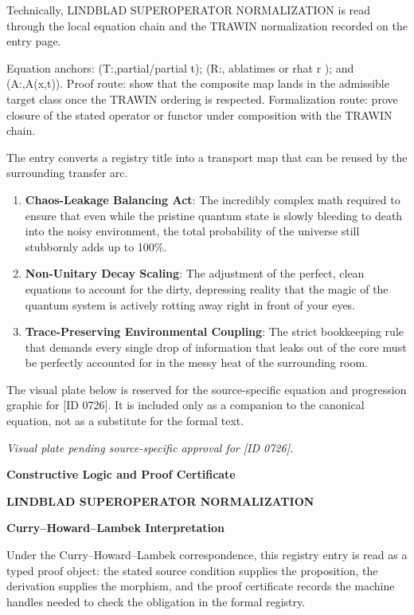 Technically, LINDBLAD SUPEROPERATOR NORMALIZATION is read through the local equation chain and the TRAWIN normalization recorded on the entry page.

Equation anchors: (T:,partial/partial t); (R:, ablatimes or rhat r ); and (A:,A(x,t)). Proof route: show that the composite map lands in the admissible target class once the TRAWIN ordering is respected. Formalization route: prove closure of the stated operator or functor under composition with the TRAWIN chain.

The entry converts a registry title into a transport map that can be reused by the surrounding transfer arc.
\endgroup

\begin{enumerate}[leftmargin=1.6em,itemsep=6pt,topsep=4pt]
\item \textbf{Chaos-Leakage Balancing Act}: The incredibly complex math required to ensure that even while the pristine quantum state is slowly bleeding to death into the noisy environment, the total probability of the universe still stubbornly adds up to 100\%.
\item \textbf{Non-Unitary Decay Scaling}: The adjustment of the perfect, clean equations to account for the dirty, depressing reality that the magic of the quantum system is actively rotting away right in front of your eyes.
\item \textbf{Trace-Preserving Environmental Coupling}: The strict bookkeeping rule that demands every single drop of information that leaks out of the core must be perfectly accounted for in the messy heat of the surrounding room.
\end{enumerate}

\begingroup\footnotesize\sloppy
The visual plate below is reserved for the source-specific equation and progression graphic for [ID 0726]. It is included only as a companion to the canonical equation, not as a substitute for the formal text.
\par\endgroup
\begingroup\footnotesize\itshape
Visual plate pending source-specific approval for [ID 0726].
\par\endgroup

\clearpage
\begingroup\tzpsupportsetup
\noindent\textbf{\fontsize{10.8pt}{12.8pt}\selectfont [ID 0726] Constructive Logic and Proof Certificate}\par
\noindent\textbf{\fontsize{10pt}{12pt}\selectfont LINDBLAD SUPEROPERATOR NORMALIZATION}\par
\vspace{0.45em}
\begingroup
\footnotesize
\setlength{\parskip}{0.22em}
\setlength{\parindent}{0pt}
\noindent\textbf{Curry--Howard--Lambek Interpretation}\par
Under the Curry--Howard--Lambek correspondence, this registry entry is read as a typed proof
object: the stated source condition supplies the proposition, the derivation supplies the
morphism, and the proof certificate records the machine handles needed to check the obligation
in the formal registry.

